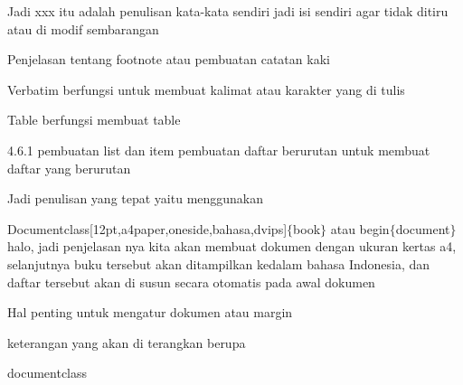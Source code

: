 Jadi xxx itu adalah penulisan kata-kata sendiri jadi isi sendiri agar tidak ditiru atau di modif sembarangan\par


 Penjelasan tentang footnote atau pembuatan catatan kaki\par

Verbatim berfungsi untuk membuat kalimat atau karakter yang di tulis\par

Table berfungsi membuat table\par


4.6.1 pembuatan list dan item pembuatan daftar berurutan untuk membuat daftar yang berurutan\par


Jadi penulisan yang tepat yaitu menggunakan\par


Documentclass[12pt,a4paper,oneside,bahasa,dvips]$ \{ $book$ \} $ atau begin$ \{ $document$ \} $ halo, jadi penjelasan nya kita akan membuat dokumen dengan ukuran kertas a4, selanjutnya buku tersebut akan ditampilkan kedalam bahasa Indonesia, dan daftar tersebut akan di susun secara otomatis pada awal dokumen\par



 Hal penting untuk mengatur dokumen atau margin\par

keterangan yang akan di terangkan berupa\par



\noindent documentclass\par

